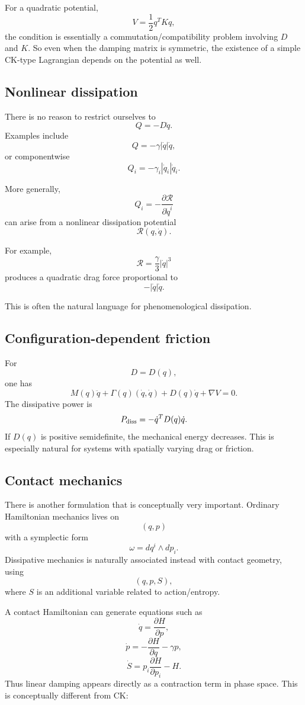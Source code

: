 For a quadratic potential, $$ V=\frac12q^TKq, $$ 
the condition is essentially a commutation/compatibility problem involving \(D\) and \(K\).
So even when the damping matrix is symmetric, the existence of a simple CK-type Lagrangian depends on the potential as well.

\subsection{Nonlinear dissipation}

There is no reason to restrict ourselves to $$ Q=-D\dot q. $$
Examples include $$ Q=-\gamma |\dot q|\dot q, $$
or componentwise
$$ Q_i=-\gamma_i|\dot q_i|\dot q_i. $$

More generally,
$$ Q_i=-\frac{\partial \mathcal R}{\partial\dot q^i} $$
can arise from a nonlinear dissipation potential
$$ \mathcal R(q,\dot q). $$

For example,$$ \mathcal R = \frac{\gamma}{3}|\dot q|^3 $$
produces a quadratic drag force proportional to
$$ -|\dot q|\dot q. $$

This is often the natural language for phenomenological dissipation.

\subsection{Configuration-dependent friction}

For $$ D=D(q), $$ one has
$$ M(q)\ddot q+\Gamma(q)(\dot q,\dot q) +D(q)\dot q+\nabla V=0. $$
The dissipative power is
$$ P_{\rm diss} = -\dot q^TD(q)\dot q. $$
If \(D(q)\) is positive semidefinite, the mechanical energy decreases.
This is especially natural for systems with spatially varying drag or friction.

\subsection{Contact mechanics}

There is another formulation that is conceptually very important.
Ordinary Hamiltonian mechanics lives on $$ (q,p) $$
with a symplectic form $$ \omega=dq^i\wedge dp_i. $$
Dissipative mechanics is naturally associated instead with contact geometry, using $$ (q,p,S), $$
where \(S\) is an additional variable related to action/entropy.

A contact Hamiltonian can generate equations such as
$$ \dot q=\frac{\partial H}{\partial p}, $$
$$ \dot p=-\frac{\partial H}{\partial q} -\gamma p, $$ 
$$ \dot S=p_i\frac{\partial H}{\partial p_i}-H. $$
Thus linear damping appears directly as a contraction term in phase space.
This is conceptually different from CK:

